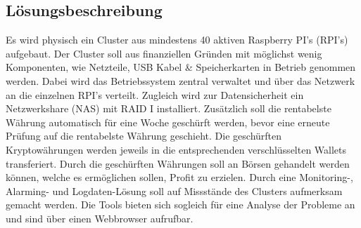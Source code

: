 
\subsection{Lösungsbeschreibung}
Es wird physisch ein Cluster aus mindestens 40 aktiven Raspberry PI's (RPI's) aufgebaut. Der Cluster soll aus finanziellen Gründen mit möglichst wenig Komponenten, wie Netzteile, USB Kabel \& Speicherkarten in Betrieb genommen werden. Dabei wird das Betriebssystem zentral verwaltet und über das Netzwerk an die einzelnen RPI's verteilt. Zugleich wird zur Datensicherheit ein Netzwerkshare (NAS) mit RAID I installiert. Zusätzlich soll die rentabelste Währung automatisch für eine Woche geschürft werden, bevor eine erneute Prüfung auf die rentabelste Währung geschieht. Die geschürften Kryptowährungen werden jeweils in die entsprechenden verschlüsselten Wallets transferiert. Durch die geschürften Währungen soll an Börsen gehandelt werden können, welche es ermöglichen sollen, Profit zu erzielen. Durch eine Monitoring-, Alarming- und Logdaten-Lösung soll auf Missstände des Clusters aufmerksam gemacht werden. Die Tools bieten sich sogleich für eine Analyse der Probleme an und sind über einen Webbrowser aufrufbar.   